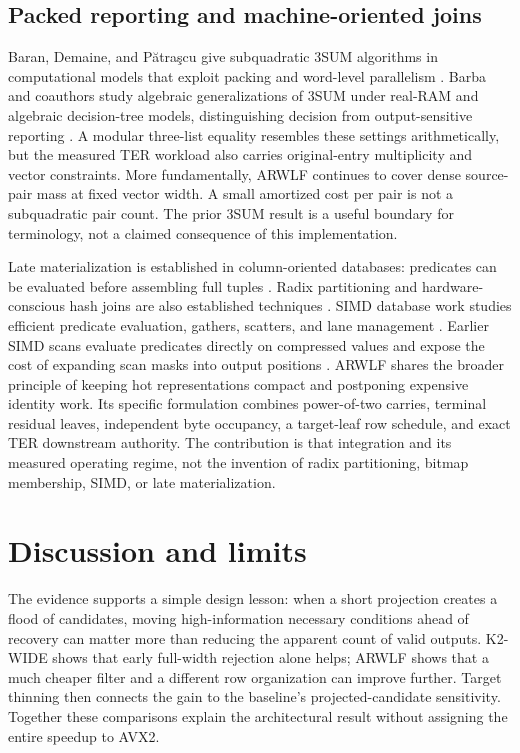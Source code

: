 \documentclass[manuscript,screen,review]{acmart}
\begin{document}
\subsection{Packed reporting and machine-oriented joins}
Baran, Demaine, and Pătraşcu give subquadratic 3SUM algorithms in computational models that exploit packing and word-level parallelism \cite{bdp2008}. Barba and coauthors study algebraic generalizations of 3SUM under real-RAM and algebraic decision-tree models, distinguishing decision from output-sensitive reporting \cite{barba2017}. A modular three-list equality resembles these settings arithmetically, but the measured TER workload also carries original-entry multiplicity and vector constraints. More fundamentally, ARWLF continues to cover dense source-pair mass at fixed vector width. A small amortized cost per pair is not a subquadratic pair count. The prior 3SUM result is a useful boundary for terminology, not a claimed consequence of this implementation.

Late materialization is established in column-oriented databases: predicates can be evaluated before assembling full tuples \cite{abadi2007}. Radix partitioning and hardware-conscious hash joins are also established techniques \cite{balkesen2013}. SIMD database work studies efficient predicate evaluation, gathers, scatters, and lane management \cite{polychroniou2015}. Earlier SIMD scans evaluate predicates directly on compressed values and expose the cost of expanding scan masks into output positions \cite{willhalm2009}. ARWLF shares the broader principle of keeping hot representations compact and postponing expensive identity work. Its specific formulation combines power-of-two carries, terminal residual leaves, independent byte occupancy, a target-leaf row schedule, and exact TER downstream authority. The contribution is that integration and its measured operating regime, not the invention of radix partitioning, bitmap membership, SIMD, or late materialization.

\section{Discussion and limits}
The evidence supports a simple design lesson: when a short projection creates a flood of candidates, moving high-information necessary conditions ahead of recovery can matter more than reducing the apparent count of valid outputs. K2-WIDE shows that early full-width rejection alone helps; ARWLF shows that a much cheaper filter and a different row organization can improve further. Target thinning then connects the gain to the baseline's projected-candidate sensitivity. Together these comparisons explain the architectural result without assigning the entire speedup to AVX2.
\end{document}
